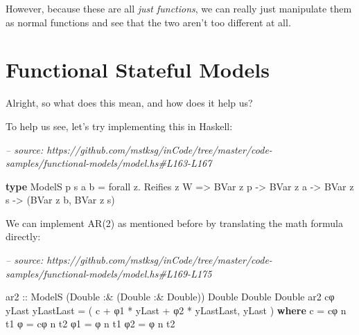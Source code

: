 \documentclass[]{article}
\newenvironment{Shaded}{}{}
\newcommand{\CommentTok}[1]{\textcolor[rgb]{0.38,0.63,0.69}{\textit{#1}}}
\newcommand{\DataTypeTok}[1]{\textcolor[rgb]{0.56,0.13,0.00}{#1}}
\newcommand{\FunctionTok}[1]{\textcolor[rgb]{0.02,0.16,0.49}{#1}}
\newcommand{\KeywordTok}[1]{\textcolor[rgb]{0.00,0.44,0.13}{\textbf{#1}}}
\newcommand{\NormalTok}[1]{#1}
\newcommand{\OtherTok}[1]{\textcolor[rgb]{0.00,0.44,0.13}{#1}}
\begin{document}
However, because these are all \emph{just functions}, we can really just
manipulate them as normal functions and see that the two aren't too different at
all.

\hypertarget{functional-stateful-models}{%
\section{Functional Stateful Models}\label{functional-stateful-models}}

Alright, so what does this mean, and how does it help us?

To help us see, let's try implementing this in Haskell:

\begin{Shaded}
\begin{Highlighting}[]
\CommentTok{-- source: https://github.com/mstksg/inCode/tree/master/code-samples/functional-models/model.hs#L163-L167}

\KeywordTok{type} \DataTypeTok{ModelS}\NormalTok{ p s a b }\FunctionTok{=}\NormalTok{ forall z}\FunctionTok{.} \DataTypeTok{Reifies}\NormalTok{ z }\DataTypeTok{W}
                   \OtherTok{=>} \DataTypeTok{BVar}\NormalTok{ z p}
                   \OtherTok{->} \DataTypeTok{BVar}\NormalTok{ z a}
                   \OtherTok{->} \DataTypeTok{BVar}\NormalTok{ z s}
                   \OtherTok{->}\NormalTok{ (}\DataTypeTok{BVar}\NormalTok{ z b, }\DataTypeTok{BVar}\NormalTok{ z s)}
\end{Highlighting}
\end{Shaded}

We can implement AR(2) as mentioned before by translating the math formula
directly:

\begin{Shaded}
\begin{Highlighting}[]
\CommentTok{-- source: https://github.com/mstksg/inCode/tree/master/code-samples/functional-models/model.hs#L169-L175}

\OtherTok{ar2 ::} \DataTypeTok{ModelS}\NormalTok{ (}\DataTypeTok{Double} \FunctionTok{:&}\NormalTok{ (}\DataTypeTok{Double} \FunctionTok{:&} \DataTypeTok{Double}\NormalTok{)) }\DataTypeTok{Double} \DataTypeTok{Double} \DataTypeTok{Double}
\NormalTok{ar2 cφ yLast yLastLast }\FunctionTok{=}\NormalTok{ ( c }\FunctionTok{+}\NormalTok{ φ1 }\FunctionTok{*}\NormalTok{ yLast }\FunctionTok{+}\NormalTok{ φ2 }\FunctionTok{*}\NormalTok{ yLastLast, yLast )}
  \KeywordTok{where}
\NormalTok{    c  }\FunctionTok{=}\NormalTok{ cφ }\FunctionTok{^^.}\NormalTok{ t1}
\NormalTok{    φ  }\FunctionTok{=}\NormalTok{ cφ }\FunctionTok{^^.}\NormalTok{ t2}
\NormalTok{    φ1 }\FunctionTok{=}\NormalTok{ φ  }\FunctionTok{^^.}\NormalTok{ t1}
\NormalTok{    φ2 }\FunctionTok{=}\NormalTok{ φ  }\FunctionTok{^^.}\NormalTok{ t2}
\end{Highlighting}
\end{Shaded}
\end{document}
